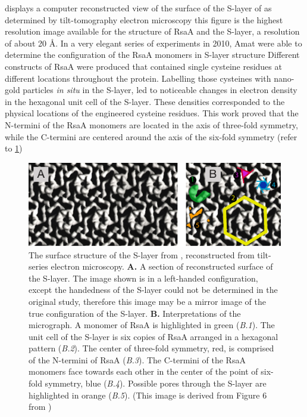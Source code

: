  displays a computer reconstructed view of the surface of the \ac{S-layer} of \caulobacter as determined by tilt-tomography electron
microscopy this figure is the highest resolution image available for the structure of RsaA and the \ac{S-layer}, a resolution of about 20 \AA{}. In a very
elegant series of experiments in 2010, Amat \etal were able to determine the configuration of the RsaA monomers in \ac{S-layer} structure Different constructs
of RsaA were produced that contained single cysteine residues at different locations throughout the protein. Labelling those cysteines with nano-gold particles \textit{in situ} in
the \ac{S-layer}, led to noticeable changes in electron density in the hexagonal unit cell of the \ac{S-layer}. These densities corresponded to the physical locations of the
engineered cysteine residues. This work proved that the N-termini of the RsaA monomers are located in the axis of three-fold symmetry, while the C-termini are centered around the
axis of the six-fold symmetry (refer to \cref{fig:intro-micrograph})

\begin{figure}[htb]
  \begin{center}
    \includegraphics[width=\textwidth]{intro/img/slayermicrograph.pdf}
  \end{center}
  \caption[Reconstructed surface of the \caulobacter \ac{S-layer}]{ The surface structure of the \ac{S-layer} from \caulobacter, reconstructed from tilt-series electron microscopy.
\textbf{A.} A section of reconstructed surface of the \caulobacter \ac{S-layer}. The image shown is in a left-handed configuration, except the handedness of the \ac{S-layer}
could not be determined in the original study, therefore this image may be a mirror image of the true configuration of the \ac{S-layer}. \textbf{B.} Interpretations of the
micrograph. A monomer of RsaA is highlighted in green (\textit{B.1}). The unit cell of the \ac{S-layer} is six copies of RsaA arranged in a hexagonal pattern (\textit{B.2}). The
center of three-fold symmetry, red, is comprised of the N-termini of RsaA (\textit{B.3}). The C-termini of the RsaA monomers face towards each other in the center of the point of
six-fold symmetry, blue (\textit{B.4}). Possible pores through the \ac{S-layer} are highlighted in orange (\textit{B.5}). (This image is derived from Figure 6 from
) }
  \label{fig:intro-micrograph}
\end{figure}

